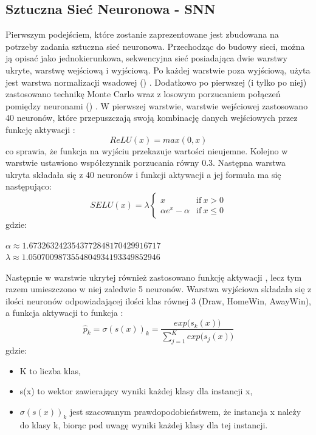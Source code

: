         \subsection{Sztuczna Sieć Neuronowa - SNN}
        \label{SNN-param}
        Pierwszym podejściem, które zostanie zaprezentowane jest zbudowana na potrzeby zadania sztuczna sieć neuronowa. Przechodząc do budowy sieci, można ją opisać jako jednokierunkowa, sekwencyjna sieć posiadająca dwie warstwy ukryte, warstwę wejściową i wyjściową. Po każdej warstwie poza wyjściową, użyta jest warstwa normalizacji wsadowej () \cite{BatchNormalization}. Dodatkowo po pierwszej (i tylko po niej) zastosowano technikę Monte Carlo wraz z losowym porzucaniem połączeń pomiędzy neuronami () \cite{MCDropout} \cite{Dropout} \cite{Dropout2}. W pierwszej warstwie, warstwie wejściowej zastosowano 40 neuronów, które przepuszczają swoją kombinację danych wejściowych przez funkcję aktywacji : \[ReLU(x) = max(0, x)\] co sprawia, że funkcja na wyjściu przekazuje wartości nieujemne. Kolejno w warstwie  ustawiono współczynnik porzucania równy 0.3. Następna warstwa ukryta składała się z 40 neuronów i funkcji aktywacji  \cite{SELU} a jej formuła ma się następująco:
        \[
        SELU(x) = \lambda
        \begin{cases}
            x &  \text{if}\ x > 0\\
            \alpha e^{x} - \alpha &  \text{if}\ x \le 0
        \end{cases}
        \]
        gdzie:
        \begin{center}
            $\alpha \approx 1.6732632423543772848170429916717$ \\ 
            $\lambda \approx 1.0507009873554804934193349852946$
        \end{center}
        Następnie w warstwie ukrytej również zastosowano funkcję aktywacji , lecz tym razem umieszczono w niej zaledwie 5 neuronów. Warstwa wyjściowa składała się z ilości neuronów odpowiadającej ilości klas równej 3 (Draw, HomeWin, AwayWin), a funkcja aktywacji to funkcja :
        \[
        \hat{p}_{k} = \sigma(s(x))_{k} = \frac{exp \big(s_{k}(x)\big)}{\sum_{j=1}^{K}exp \big(s_{j}(x)\big)}
        \]
        gdzie:
        \begin{itemize}
            \item K to liczba klas,
            \item s(x) to wektor zawierający wyniki każdej klasy dla instancji x,
            \item $\sigma(s(x))_{k}$ jest szacowanym prawdopodobieństwem, że instancja x należy do klasy k, biorąc pod uwagę wyniki każdej klasy dla tej instancji.
        \end{itemize}
